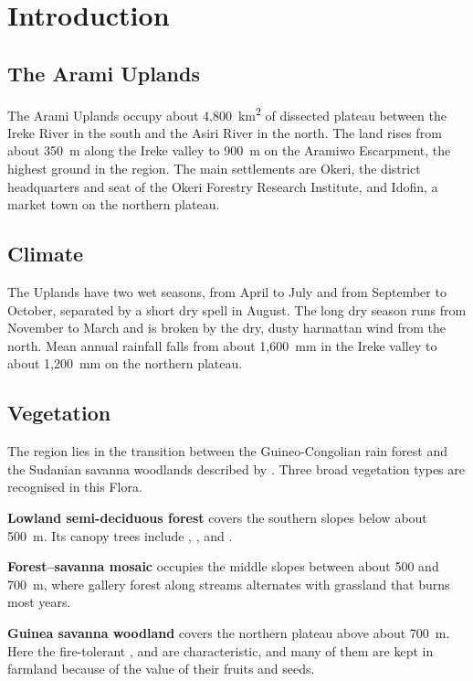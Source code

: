 \chapter{Introduction}

\section{The Arami Uplands}
The Arami Uplands occupy about 4,800~km\textsuperscript{2} of dissected
plateau between the Ireke River in the south and the Asiri River in the
north. The land rises from about 350~m along the Ireke valley to 900~m on
the Aramiwo Escarpment, the highest ground in the region. The main
settlements are Okeri, the district headquarters and seat of the Okeri
Forestry Research Institute, and Idofin, a market town on the northern
plateau.

\section{Climate}
The Uplands have two wet seasons, from April to July and from September
to October, separated by a short dry spell in August. The long dry
season runs from November to March and is broken by the dry, dusty
harmattan wind from the north. Mean annual rainfall falls from about
1,600~mm in the Ireke valley to about 1,200~mm on the northern plateau.

\section{Vegetation}
The region lies in the transition between the Guineo-Congolian rain
forest and the Sudanian savanna woodlands described by
\citet{white1983}. Three broad vegetation types are recognised in this
Flora.

\textbf{Lowland semi-deciduous forest} covers the southern slopes below
about 500~m. Its canopy trees include ,
,  and
.

\textbf{Forest--savanna mosaic} occupies the middle slopes between
about 500 and 700~m, where gallery forest along streams alternates
with grassland that burns most years.

\textbf{Guinea savanna woodland} covers the northern plateau above
about 700~m. Here the fire-tolerant ,
 and  are
characteristic, and many of them are kept in farmland because of the
value of their fruits and seeds.

